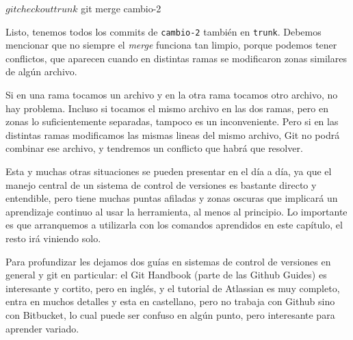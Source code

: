 \begin{shell}
$ git checkout trunk
$ git merge cambio-2
\end{shell}

Listo, tenemos todos los commits de \verb|cambio-2| también en \verb|trunk|. Debemos mencionar que no siempre el \textit{merge} funciona tan limpio, porque podemos tener conflictos, que aparecen cuando en distintas ramas se modificaron zonas similares de algún archivo.

Si en una rama tocamos un archivo y en la otra rama tocamos otro archivo, no hay problema. Incluso si tocamos el mismo archivo en las dos ramas, pero en zonas lo suficientemente separadas, tampoco es un inconveniente. Pero si en las distintas ramas modificamos las mismas lineas del mismo archivo, Git no podrá combinar ese archivo, y tendremos un conflicto que habrá que resolver. 

Esta y muchas otras situaciones se pueden presentar en el día a día, ya que el manejo central de un sistema de control de versiones es bastante directo y entendible, pero tiene muchas puntas afiladas y zonas oscuras que implicará un aprendizaje continuo al usar la herramienta, al menos al principio. Lo importante es que arranquemos a utilizarla con los comandos aprendidos en este capítulo, el resto irá viniendo solo.

Para profundizar les dejamos dos guías en sistemas de control de versiones en general y git en particular: el Git Handbook \cite{git-tuto-github-handbook} (parte de las Github Guides) es interesante y cortito, pero en inglés, y el tutorial de Atlassian \cite{git-tuto-atlassian} es muy completo, entra en muchos detalles y esta en castellano, pero no trabaja con Github sino con Bitbucket, lo cual puede ser confuso en algún punto, pero interesante para aprender variado.
